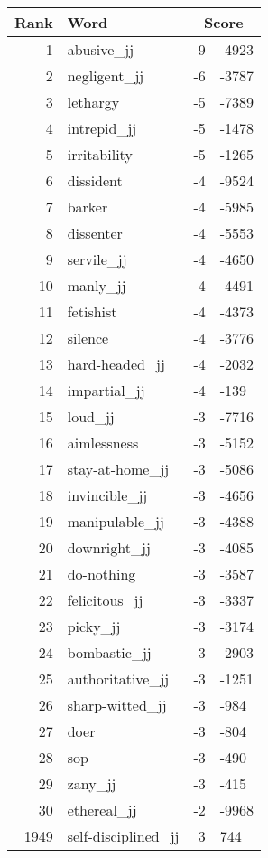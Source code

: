 \begin{longtable}[!htbp]{| rlr@{.}l |}
    \hline
    \textbf{Rank} & \textbf{Word} & \multicolumn{2}{c|}{\textbf{Score}} \\
    \hline
    \endhead
    1 & abusive\_jj & -9 & -4923 \\
    2 & negligent\_jj & -6 & -3787 \\
    3 & lethargy & -5 & -7389 \\
    4 & intrepid\_jj & -5 & -1478 \\
    5 & irritability & -5 & -1265 \\
    6 & dissident & -4 & -9524 \\
    7 & barker & -4 & -5985 \\
    8 & dissenter & -4 & -5553 \\
    9 & servile\_jj & -4 & -4650 \\
    10 & manly\_jj & -4 & -4491 \\
    11 & fetishist & -4 & -4373 \\
    12 & silence & -4 & -3776 \\
    13 & hard-headed\_jj & -4 & -2032 \\
    14 & impartial\_jj & -4 & -139 \\
    15 & loud\_jj & -3 & -7716 \\
    16 & aimlessness & -3 & -5152 \\
    17 & stay-at-home\_jj & -3 & -5086 \\
    18 & invincible\_jj & -3 & -4656 \\
    19 & manipulable\_jj & -3 & -4388 \\
    20 & downright\_jj & -3 & -4085 \\
    21 & do-nothing & -3 & -3587 \\
    22 & felicitous\_jj & -3 & -3337 \\
    23 & picky\_jj & -3 & -3174 \\
    24 & bombastic\_jj & -3 & -2903 \\
    25 & authoritative\_jj & -3 & -1251 \\
    26 & sharp-witted\_jj & -3 & -984 \\
    27 & doer & -3 & -804 \\
    28 & sop & -3 & -490 \\
    29 & zany\_jj & -3 & -415 \\
    30 & ethereal\_jj & -2 & -9968 \\
    1949 & self-disciplined\_jj & 3 & 744 \\

\end{longtable}

